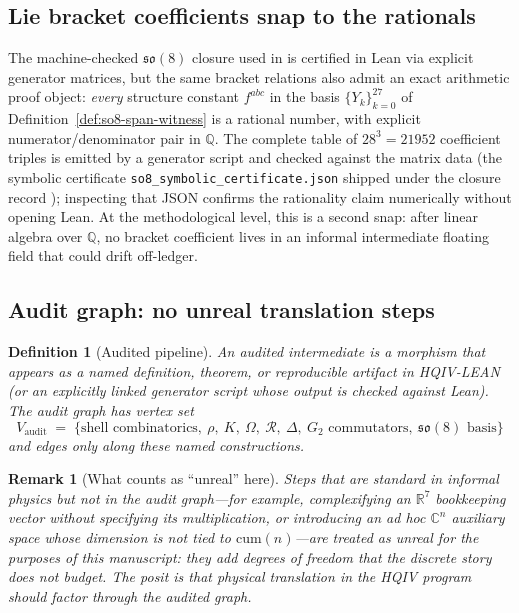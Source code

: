 \documentclass[11pt]{amsart}
\newtheorem{definition}[theorem]{Definition}
\newtheorem{remark}[theorem]{Remark}
\begin{document}
\subsection{Lie bracket coefficients snap to the rationals}

The machine-checked \(\mathfrak{so}(8)\) closure used in \cite{hqiv-so8-paper} is certified in Lean via explicit generator matrices, but the same bracket relations also admit an exact arithmetic proof object: \emph{every} structure constant \(f^{abc}\) in the basis \(\{Y_k\}_{k=0}^{27}\) of Definition~\ref{def:so8-span-witness} is a rational number, with explicit numerator/denominator pair in \(\mathbb{Q}\). The complete table of \(28^3=21952\) coefficient triples is emitted by a generator script and checked against the matrix data (the symbolic certificate \texttt{so8\_symbolic\_certificate.json} shipped under the closure record \cite{hqiv-so8-paper}); inspecting that JSON confirms the rationality claim numerically without opening Lean. At the methodological level, this is a second snap: after linear algebra over \(\mathbb{Q}\), no bracket coefficient lives in an informal intermediate floating field that could drift off-ledger.

\subsection{Audit graph: no unreal translation steps}

\begin{definition}[Audited pipeline]
\label{def:audit-graph}
An \emph{audited intermediate} is a morphism that appears as a named definition, theorem, or reproducible artifact in HQIV-LEAN (or an explicitly linked generator script whose output is checked against Lean). The \emph{audit graph} has vertex set
\[
V_{\mathrm{audit}} \;=\; \bigl\{\text{shell combinatorics},\ \rho,\ K,\ \Omega,\ \mathcal{R},\ \Delta,\ G_2\text{ commutators},\ \mathfrak{so}(8)\text{ basis}\bigr\}
\]
and edges only along these named constructions.
\end{definition}

\begin{remark}[What counts as ``unreal'' here]
Steps that are standard in informal physics but \emph{not} in the audit graph---for example, complexifying an \(\mathbb{R}^7\) bookkeeping vector without specifying its multiplication, or introducing an ad hoc \(\mathbb{C}^n\) auxiliary space whose dimension is not tied to \(\mathrm{cum}(n)\)---are treated as \emph{unreal} for the purposes of this manuscript: they add degrees of freedom that the discrete story does not budget. The posit is that physical translation in the HQIV program should factor through the audited graph.
\end{remark}
\end{document}
